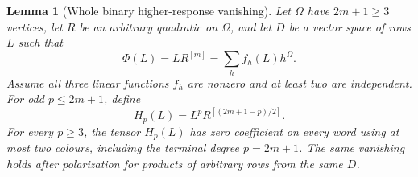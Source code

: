 \documentclass[11pt]{article}
\newtheorem{lemma}[theorem]{Lemma}
\theoremstyle{definition}
\theoremstyle{plain}
\numberwithin{equation}{section}
\begin{document}
\begin{lemma}[Whole binary higher-response vanishing]\label{lem:higher}
Let \(\Omega\) have \(2m+1\ge3\) vertices, let \(R\) be an arbitrary quadratic
on \(\Omega\), and let \(D\) be a vector space of rows \(L\) such that
\begin{equation}
 \Phi(L)=L R^{[m]}=\sum_h f_h(L)h^\Omega.
 \tag{2}\label{eq:root}
\end{equation}
Assume all three linear functions \(f_h\) are nonzero and at least two are
independent. For odd \(p\le2m+1\), define
\[
 H_p(L)=L^p R^{[(2m+1-p)/2]}.
\]
For every \(p\ge3\), the tensor \(H_p(L)\) has zero coefficient on every word
using at most two colours, including the terminal degree \(p=2m+1\).
The same vanishing holds after polarization for products of arbitrary rows
from the same \(D\).
\end{lemma}
\end{document}
